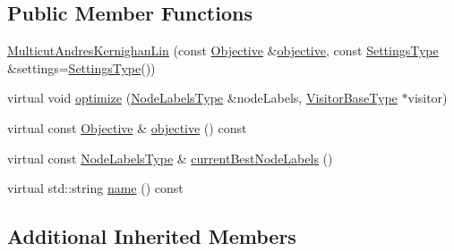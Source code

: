 \subsection*{Public Member Functions}
\begin{DoxyCompactItemize}
\item 
\hyperlink{classnifty_1_1graph_1_1optimization_1_1multicut_1_1MulticutAndresKernighanLin_a09ef61a0f8898cc0184b23f30cc0e79d}{Multicut\+Andres\+Kernighan\+Lin} (const \hyperlink{classnifty_1_1graph_1_1optimization_1_1multicut_1_1MulticutAndres_ac2d2044ef4dc45dbacdb3f34b001760f}{Objective} \&\hyperlink{classnifty_1_1graph_1_1optimization_1_1multicut_1_1MulticutAndresKernighanLin_a8ffe27b83b0561e7765ad435dd44aa56}{objective}, const \hyperlink{structnifty_1_1graph_1_1optimization_1_1multicut_1_1MulticutAndresKernighanLin_1_1SettingsType}{Settings\+Type} \&settings=\hyperlink{structnifty_1_1graph_1_1optimization_1_1multicut_1_1MulticutAndresKernighanLin_1_1SettingsType}{Settings\+Type}())
\item 
virtual void \hyperlink{classnifty_1_1graph_1_1optimization_1_1multicut_1_1MulticutAndresKernighanLin_ad5ae9a56d69e579953b0e5e209694a46}{optimize} (\hyperlink{classnifty_1_1graph_1_1optimization_1_1multicut_1_1MulticutAndres_aebe9bae6ca2760f72e19ec62504de209}{Node\+Labels\+Type} \&node\+Labels, \hyperlink{classnifty_1_1graph_1_1optimization_1_1multicut_1_1MulticutAndres_a2d78bb58be29b7d46e9c653489a6d1de}{Visitor\+Base\+Type} $\ast$visitor)
\item 
virtual const \hyperlink{classnifty_1_1graph_1_1optimization_1_1multicut_1_1MulticutAndres_ac2d2044ef4dc45dbacdb3f34b001760f}{Objective} \& \hyperlink{classnifty_1_1graph_1_1optimization_1_1multicut_1_1MulticutAndresKernighanLin_a8ffe27b83b0561e7765ad435dd44aa56}{objective} () const 
\item 
virtual const \hyperlink{classnifty_1_1graph_1_1optimization_1_1multicut_1_1MulticutAndres_aebe9bae6ca2760f72e19ec62504de209}{Node\+Labels\+Type} \& \hyperlink{classnifty_1_1graph_1_1optimization_1_1multicut_1_1MulticutAndresKernighanLin_a30e3c0ccfb14a5c01514cc6ca90078c8}{current\+Best\+Node\+Labels} ()
\item 
virtual std\+::string \hyperlink{classnifty_1_1graph_1_1optimization_1_1multicut_1_1MulticutAndresKernighanLin_ad5fe999b7c1cad0c2ed964941944190d}{name} () const 
\end{DoxyCompactItemize}
\subsection*{Additional Inherited Members}



